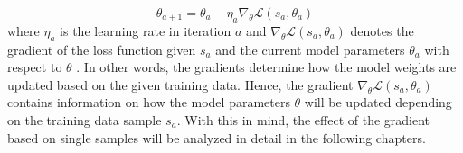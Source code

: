 \begin{equation}
    \theta_{a+1} = \theta_a - \eta_a \nabla_{\theta} \mathcal{L}(s_a, \theta_a)
    \label{eq:gradient_descent}
\end{equation}
where $\eta_a$ is the learning rate in iteration $a$ and $\nabla_{\theta} \mathcal{L}(s_a, \theta_a)$ denotes the gradient of the loss function given $s_a$ and the current model parameters $\theta_a$ with respect to $\theta$ \cite{DBLP:conf/acl/LinLX024}. In other words, the gradients determine how the model weights are updated based on the given training data. Hence, the gradient $\nabla_{\theta} \mathcal{L}(s_a, \theta_a)$ contains information on how the model parameters $\theta$ will be updated depending on the training data sample $s_a$. With this in mind, the effect of the gradient based on single samples will be analyzed in detail in the following chapters.

